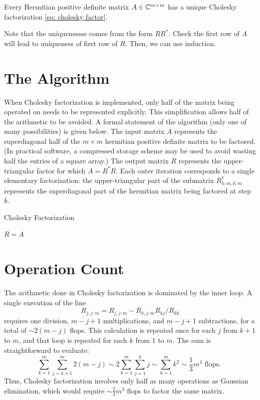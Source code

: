 \begin{theorem}
\label{thm: Cholesky factorization}
Every Hermitian positive definite matrix $A\in \mathbb{C}^{m\times m}$ has a unique Cholesky factorization \eqref{eq: cholesky factor}. 
\end{theorem}
Note that the uniquenessss comes from the form $RR^*$. Check the first row of $A$ will lead to uniqueness of first row of $R$. Then, we can use induction.  

\section{The Algorithm}
When Cholesky factorization is implemented, only half of the matrix being operated on needs to be represented explicitly. This simplification allows half of the arithmetic to be avoided. A formal statement of the algorithm (only one of many possibilities) is given below. The input matrix $A$ represents the superdiagonal half of the $m \times m$ hermitian positive definite matrix to be factored. (In practical software, a compressed storage scheme may be used to avoid wasting half the entries of a square array.) The output matrix $R$ represents the upper-triangular factor for which $A=R^* R$. Each outer iteration corresponds to a single elementary factorization: the upper-triangular part of the submatrix $R_{k: m, k: m}^*$ represents the superdiagonal part of the hermitian matrix being factored at step $k$.

\begin{algorithm}[H]
    \caption{Cholesky Factorization}
    \label{Algo 23.1}
    $R = A$\; 
    
\end{algorithm}

\section{Operation Count}

The arithmetic done in Cholesky factorization is dominated by the inner loop. A single execution of the line
$$
R_{j, j: m}=R_{j, j: m}-R_{k, j: m} R_{k j} / R_{k k}
$$
requires one division, $m-j+1$ multiplications, and $m-j+1$ subtractions, for a total of $\sim 2(m-j)$ flops. This calculation is repeated once for each $j$ from $k+1$ to $m$, and that loop is repeated for each $k$ from 1 to $m$. The sum is straightforward to evaluate:
$$
\sum_{k=1}^m \sum_{j=k+1}^m 2(m-j) \sim 2 \sum_{k=1}^m \sum_{j=1}^k j \sim \sum_{k=1}^m k^2 \sim \frac{1}{3} m^3 \text { flops. }
$$
Thus, Cholesky factorization involves only half as many operations as Gaussian elimination, which would require $\sim \frac{2}{3} m^3$ flops to factor the same matrix.

